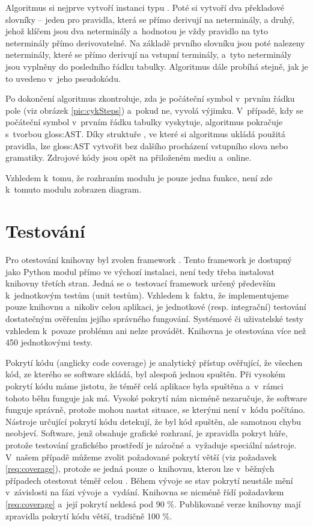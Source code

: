		Algoritmus si nejprve vytvoří instanci typu . Poté si vytvoří dva překladové slovníky -- jeden pro pravidla, která se přímo derivují na neterminály, a druhý, jehož klíčem jsou dva neterminály a~hodnotou je vždy pravidlo na tyto neterminály přímo derivovatelné. Na základě prvního slovníku jsou poté nalezeny neterminály, které se přímo derivují na vstupní terminály, a~tyto neterminály jsou vyplněny do posledního řádku tabulky. Algoritmus dále probíhá stejně, jak je to uvedeno v~jeho pseudokódu.
		
		Po dokončení algoritmus zkontroluje, zda je počáteční symbol v~prvním řádku pole (viz obrázek \ref{pic:cykSteps}) a~pokud ne, vyvolá výjimku. V~případě, kdy se počáteční symbol v~prvním řádku tabulky vyskytuje, algoritmus pokračuje s~tvorbou \gls{gloss:AST}. Díky struktuře , ve které si algoritmus ukládá použitá pravidla, lze \gls{gloss:AST} vytvořit bez dalšího procházení vstupního slova nebo gramatiky. Zdrojové kódy jsou opět na přiloženém mediu a~online.
	
		Vzhledem k~tomu, že rozhraním modulu je pouze jedna funkce, není zde k~tomuto modulu zobrazen diagram.
		
	\section{Testování}	
		Pro otestování knihovny byl zvolen framework . Tento framework je dostupný jako Python modul přímo ve výchozí instalaci, není tedy třeba instalovat knihovny třetích stran. Jedná se o~testovací framework určený především k~jednotkovým testům (unit testům). Vzhledem k~faktu, že implementujeme pouze knihovnu a~nikoliv celou aplikaci, je jednotkové (resp. integrační) testování dostatečným ověřením jejího správného fungování. Systémové či uživatelské testy vzhledem k~povaze problému ani nelze provádět. Knihovna je otestována více než 450 jednotkovými testy.
		
		Pokrytí kódu (anglicky code coverage) \cite{Ammann:2008:IST:1355340} je analytický přístup ověřující, že všechen kód, ze kterého se software skládá, byl alespoň jednou spuštěn.
		Při vysokém pokrytí kódu máme jistotu, že téměř celá aplikace byla spuštěna a~v~rámci tohoto běhu funguje jak má. Vysoké pokrytí nám nicméně nezaručuje, že software funguje správně, protože mohou nastat situace, se kterými není v~kódu počítáno.
		Nástroje určující pokrytí kódu detekují, že byl kód spuštěn, ale samotnou chybu neobjeví. Software, jenž obsahuje grafické rozhraní, je zpravidla pokryt hůře, protože testování grafického prostředí je náročné a~vyžaduje speciální nástroje. V~našem případě můžeme zvolit požadované pokrytí větší (viz požadavek \ref{req:coverage}), protože se jedná pouze o~knihovnu, kterou lze v~běžných případech otestovat téměř celou \cite{Ammann:2008:IST:1355340}. Během vývoje se stav pokrytí neustále mění v~závislosti na fázi vývoje a~vydání. Knihovna se nicméně řídí požadavkem \ref{req:coverage} a~její pokrytí neklesá pod 90 \%. Publikované verze knihovny mají zpravidla pokrytí kódu větší, tradičně 100 \%.
		
